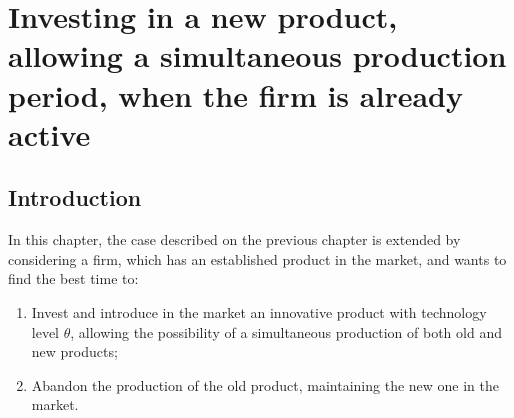 
\chapter{Investing in a new product, allowing a simultaneous production period, when the firm is already active}
\label{chapter:3}



\section{Introduction}
\label{section:3_intro}




In this chapter, the case described on the previous chapter is extended by considering a firm, which has an established product in the market, and wants to find the best time to:
\begin{enumerate}
	\item Invest and introduce in the market an innovative product with technology level $\theta$, allowing the possibility of a simultaneous production of both old and new products;
	\item Abandon the production of the old product, maintaining the new one in the market.
\end{enumerate}


